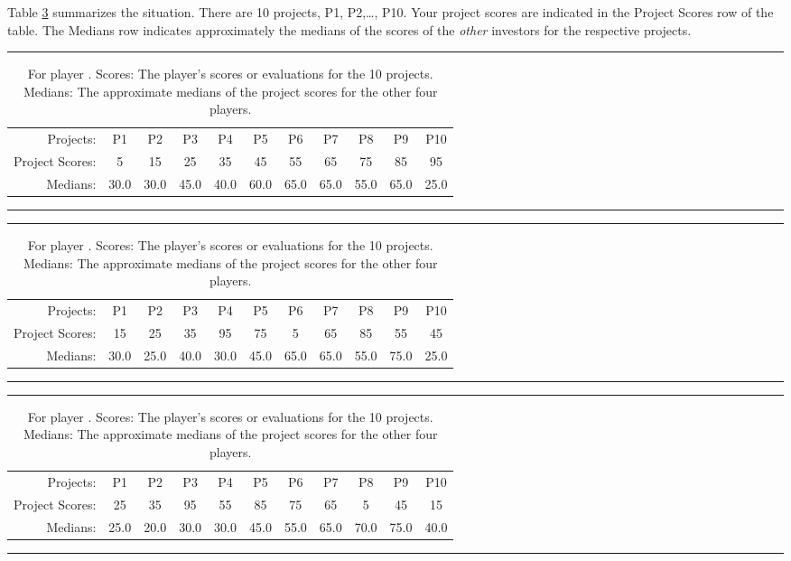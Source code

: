 \documentclass[11pt, oneside]{article}   	%
\begin{document}



Table \ref{fig:scorescase2} summarizes the situation. There are 10 projects, P1, P2,\ldots , P10.
Your project scores are indicated in the Project Scores row of the table. The Medians row indicates approximately the medians of the scores of the \emph{other} investors for the respective projects.

\ifnum{}
\begin{table}[h]
\centering
\rule{\textwidth}{1pt}
\begin{tabular}{r|cccccccccc}
Projects: & P1 & P2 & P3 & P4 & P5 & P6 & P7 & P8 & P9 & P10 \\
Project Scores: & 5 & 15 & 25 & 35 & 45 & 55 & 65 & 75 & 85 & 95 \\
Medians: & 30.0 & 30.0 & 45.0 & 40.0 & 60.0 & 65.0 & 65.0 & 55.0 & 65.0 & 25.0 \\
\end{tabular}
\caption{For player \theplayer . Scores: The player's scores or evaluations for the 10 projects. Medians: The approximate medians of the project scores for the other four players.}
\label{fig:scorescase2}
\rule{\textwidth}{1pt}
\end{table}
\fi
\ifnum{}
\begin{table}[h]
\centering
\rule{\textwidth}{1pt}
\begin{tabular}{r|cccccccccc}
Projects: & P1 & P2 & P3 & P4 & P5 & P6 & P7 & P8 & P9 & P10 \\
Project Scores: & 15 & 25 & 35 & 95 & 75 & 5 & 65 & 85 & 55 & 45 \\
Medians: & 30.0 & 25.0 & 40.0 & 30.0 & 45.0 & 65.0 & 65.0 & 55.0 & 75.0 & 25.0 \\
\end{tabular}
\caption{For player \theplayer . Scores: The player's scores or evaluations for the 10 projects. Medians: The approximate medians of the project scores for the other four players.}
\label{fig:scorescase2}
\rule{\textwidth}{1pt}
\end{table}
\fi
\ifnum{}
\begin{table}[h]
\centering
\rule{\textwidth}{1pt}
\begin{tabular}{r|cccccccccc}
Projects: & P1 & P2 & P3 & P4 & P5 & P6 & P7 & P8 & P9 & P10 \\
Project Scores: & 25 & 35 & 95 & 55 & 85 & 75 & 65 & 5 & 45 & 15 \\
Medians: & 25.0 & 20.0 & 30.0 & 30.0 & 45.0 & 55.0 & 65.0 & 70.0 & 75.0 & 40.0 \\
\end{tabular}
\caption{For player \theplayer . Scores: The player's scores or evaluations for the 10 projects. Medians: The approximate medians of the project scores for the other four players.}
\label{fig:scorescase2}
\rule{\textwidth}{1pt}
\end{table}
\end{document}
